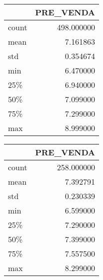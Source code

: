 \begin{tabular}{lr}
\toprule
{} &   PRE\_VENDA \\
\midrule
count &  498.000000 \\
mean  &    7.161863 \\
std   &    0.354674 \\
min   &    6.470000 \\
25\%   &    6.940000 \\
50\%   &    7.099000 \\
75\%   &    7.299000 \\
max   &    8.999000 \\
\bottomrule
\end{tabular}

\begin{tabular}{lr}
\toprule
{} &   PRE\_VENDA \\
\midrule
count &  258.000000 \\
mean  &    7.392791 \\
std   &    0.230339 \\
min   &    6.599000 \\
25\%   &    7.290000 \\
50\%   &    7.399000 \\
75\%   &    7.557500 \\
max   &    8.299000 \\
\bottomrule
\end{tabular}
